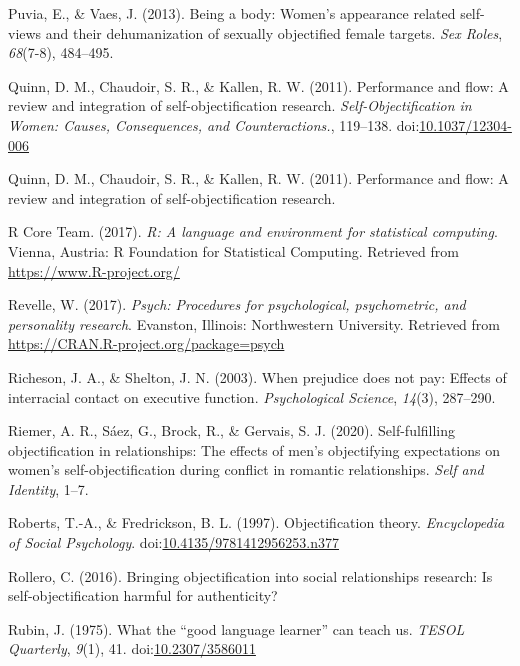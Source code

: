 \documentclass[man]{apa6}
\begin{document}
\hypertarget{ref-puvia2013being}{}
Puvia, E., \& Vaes, J. (2013). Being a body: Women's appearance related
self-views and their dehumanization of sexually objectified female
targets. \emph{Sex Roles}, \emph{68}(7-8), 484--495.

\hypertarget{ref-quinnetal}{}
Quinn, D. M., Chaudoir, S. R., \& Kallen, R. W. (2011). Performance and
flow: A review and integration of self-objectification research.
\emph{Self-Objectification in Women: Causes, Consequences, and
Counteractions.}, 119--138.
doi:\href{https://doi.org/10.1037/12304-006}{10.1037/12304-006}

\hypertarget{ref-quinn2011performance}{}
Quinn, D. M., Chaudoir, S. R., \& Kallen, R. W. (2011). Performance and
flow: A review and integration of self-objectification research.

\hypertarget{ref-R-base}{}
R Core Team. (2017). \emph{R: A language and environment for statistical
computing}. Vienna, Austria: R Foundation for Statistical Computing.
Retrieved from \url{https://www.R-project.org/}

\hypertarget{ref-R-psych}{}
Revelle, W. (2017). \emph{Psych: Procedures for psychological,
psychometric, and personality research}. Evanston, Illinois:
Northwestern University. Retrieved from
\url{https://CRAN.R-project.org/package=psych}

\hypertarget{ref-richeson2003prejudice}{}
Richeson, J. A., \& Shelton, J. N. (2003). When prejudice does not pay:
Effects of interracial contact on executive function.
\emph{Psychological Science}, \emph{14}(3), 287--290.

\hypertarget{ref-riemer2020self}{}
Riemer, A. R., Sáez, G., Brock, R., \& Gervais, S. J. (2020).
Self-fulfilling objectification in relationships: The effects of men's
objectifying expectations on women's self-objectification during
conflict in romantic relationships. \emph{Self and Identity}, 1--7.

\hypertarget{ref-robertsfredrickson}{}
Roberts, T.-A., \& Fredrickson, B. L. (1997). Objectification theory.
\emph{Encyclopedia of Social Psychology}.
doi:\href{https://doi.org/10.4135/9781412956253.n377}{10.4135/9781412956253.n377}

\hypertarget{ref-rollero2016bringing}{}
Rollero, C. (2016). Bringing objectification into social relationships
research: Is self-objectification harmful for authenticity?

\hypertarget{ref-rubin1975}{}
Rubin, J. (1975). What the ``good language learner'' can teach us.
\emph{TESOL Quarterly}, \emph{9}(1), 41.
doi:\href{https://doi.org/10.2307/3586011}{10.2307/3586011}
\end{document}
